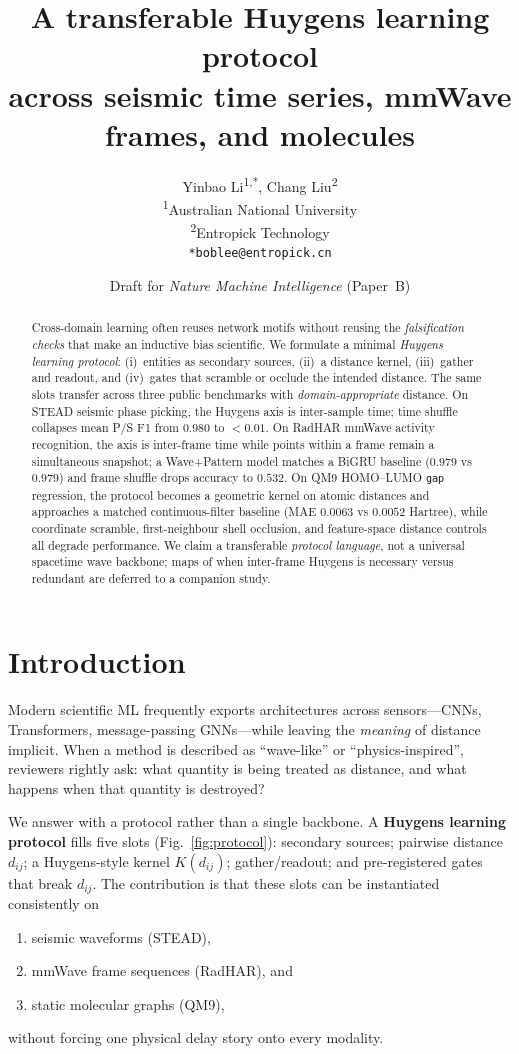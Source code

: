 \documentclass[twocolumn,10pt]{article}
\title{A transferable Huygens learning protocol\\
across seismic time series, mmWave frames, and molecules}
\author{
  Yinbao Li\textsuperscript{1,*}, Chang Liu\textsuperscript{2}\\
  \textsuperscript{1}Australian National University\\
  \textsuperscript{2}Entropick Technology\\
  \texttt{*boblee@entropick.cn}
}
\date{Draft for \emph{Nature Machine Intelligence} (Paper~B)}
\newcommand{\gap}{\texttt{gap}}
\begin{document}
\maketitle

\begin{abstract}
\noindent
Cross-domain learning often reuses network motifs without reusing the
\emph{falsification checks} that make an inductive bias scientific.
We formulate a minimal \emph{Huygens learning protocol}: (i)~entities as
secondary sources, (ii)~a distance kernel, (iii)~gather and readout, and
(iv)~gates that scramble or occlude the intended distance.
The same slots transfer across three public benchmarks with
\emph{domain-appropriate} distance.
On STEAD seismic phase picking, the Huygens axis is inter-sample time; time
shuffle collapses mean P/S F1 from $0.980$ to $<0.01$.
On RadHAR mmWave activity recognition, the axis is inter-frame time while
points within a frame remain a simultaneous snapshot; a Wave+Pattern model
matches a BiGRU baseline ($0.979$ vs $0.979$) and frame shuffle drops accuracy
to $0.532$.
On QM9 HOMO--LUMO \gap{} regression, the protocol becomes a geometric kernel on
atomic distances and approaches a matched continuous-filter baseline
(MAE $0.0063$ vs $0.0052$ Hartree), while coordinate scramble, first-neighbour
shell occlusion, and feature-space distance controls all degrade performance.
We claim a transferable \emph{protocol language}, not a universal spacetime
wave backbone; maps of when inter-frame Huygens is necessary versus redundant
are deferred to a companion study.
\end{abstract}

\section*{Introduction}
Modern scientific ML frequently exports architectures across sensors---CNNs,
Transformers, message-passing GNNs---while leaving the \emph{meaning} of
distance implicit.
When a method is described as ``wave-like'' or ``physics-inspired'', reviewers
rightly ask: what quantity is being treated as distance, and what happens when
that quantity is destroyed?

We answer with a protocol rather than a single backbone.
A \textbf{Huygens learning protocol} fills five slots (Fig.~\ref{fig:protocol}):
secondary sources; pairwise distance $d_{ij}$; a Huygens-style kernel
$K(d_{ij})$; gather/readout; and pre-registered gates that break $d_{ij}$.
The contribution is that these slots can be instantiated consistently on
\begin{enumerate}[label=(\alph*)]
\item seismic waveforms (STEAD)\cite{mousavi2019stead},
\item mmWave frame sequences (RadHAR)\cite{singh2019radhar}, and
\item static molecular graphs (QM9)\cite{ramakrishnan2014qm9},
\end{enumerate}
without forcing one physical delay story onto every modality.
\end{document}
